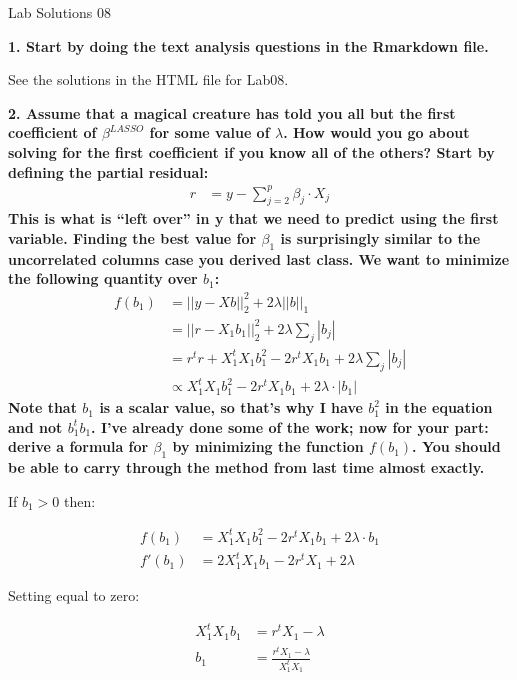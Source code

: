 \documentclass[12pt,hidelinks]{article}
\numberwithin{equation}{section}
\begin{document}
{\LARGE Lab Solutions 08}

\vspace*{12pt}

\textbf{1. Start by doing the text analysis questions in the Rmarkdown file.}

\vspace*{12pt}

See the solutions in the HTML file for Lab08.

\vspace*{12pt}

\textbf{2. Assume that a magical creature has told you all but the first
coefficient of $\beta^{LASSO}$ for some value of $\lambda$. How would you
go about solving for the first coefficient if you know all of the others?
Start by defining the partial residual:}
\begin{align}
r &= y - \sum_{j = 2}^p \beta_j \cdot X_j
\end{align}
\textbf{This is what is ``left over'' in y that we need to predict using the first
variable. Finding the best value for $\beta_1$ is surprisingly similar to the
uncorrelated columns case you derived last class. We want to minimize the
following quantity over $b_1$:}
\begin{align}
f(b_1) &= || y - X b ||_2^2 + 2 \lambda || b ||_1 \\
&= || r - X_1 b_1 ||_2^2 + 2 \lambda \sum_j | b_j | \\
&= r^t r + X_1^t X_1 b_1^2 - 2 r^t X_1 b_1 + 2 \lambda \sum_j | b_j | \\
&\propto X_1^t X_1 b_1^2 - 2 r^t X_1 b_1 + 2 \lambda \cdot | b_1 |
\end{align}
\textbf{Note that $b_1$ is a scalar value, so that's why I have $b_1^2$ in the equation
and not $b_1^t b_1$. I've already done some of the work; now for your part:
derive a formula for $\beta_1$ by minimizing the function $f(b_1)$. You should
be able to carry through the method from last time almost exactly.}

\vspace*{12pt}

If $b_1 > 0$ then:

\begin{align}
f(b_1) &= X_1^t X_1 b_1^2 - 2 r^t X_1 b_1 + 2 \lambda \cdot b_1 \\
f'(b_1) &= 2 X_1^t X_1 b_1 - 2 r^t X_1 + 2 \lambda
\end{align}

Setting equal to zero:

\begin{align}
X_1^t X_1 b_1 &= r^t X_1 - \lambda \\
b_1 &= \frac{r^t X_1 - \lambda}{ X_1^t X_1}
\end{align}
\end{document}

